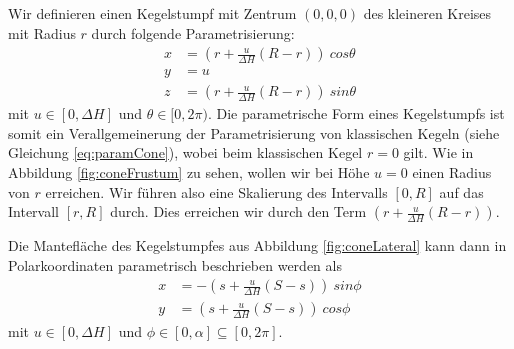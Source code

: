 Wir definieren einen Kegelstumpf mit Zentrum $(0,0,0)$ des kleineren Kreises mit Radius $r$ durch folgende Parametrisierung: 
\begin{equation} \label{eq:paramFrustum}
\begin{aligned}
x &= (r + \frac{u}{\Delta H} (R - r))~cos \theta \\
y &= u \\
z &= (r + \frac{u}{\Delta H} (R - r))~sin \theta
\end{aligned}
\end{equation}
mit $u\in [0, \Delta H]$ und $\theta \in [0, 2\pi)$. Die parametrische Form eines Kegelstumpfs ist somit ein Verallgemeinerung der Parametrisierung von klassischen Kegeln (siehe Gleichung \ref{eq:paramCone}), wobei beim klassischen Kegel $r = 0$ gilt. Wie in Abbildung \ref{fig:coneFrustum} zu sehen, wollen wir bei Höhe $u=0$ einen Radius von $r$ erreichen. Wir führen also eine Skalierung des Intervalls $[0, R]$ auf das Intervall $[r, R]$ durch. Dies erreichen wir durch den Term $(r + \frac{u}{\Delta H} (R - r))$. \bigskip



Die Mantefläche des Kegelstumpfes aus Abbildung \ref{fig:coneLateral} kann dann in Polarkoordinaten parametrisch beschrieben werden als
\begin{equation} \label{eq:paramLateral}
\begin{aligned}
x &= -(s + \frac{u}{\Delta H}(S-s)) ~sin \phi \\
y &= (s + \frac{u}{\Delta H} (S-s)) ~cos \phi
\end{aligned}
\end{equation}
mit  $u\in [0, \Delta H]$ und $\phi \in [0, \alpha] \subseteq [0, 2\pi]$. 

